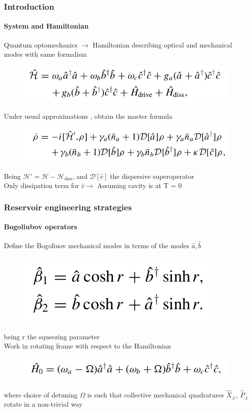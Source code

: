 \documentclass[aspectratio=43]{beamer}
\begin{document}
\begin{frame}
	
	\frametitle{Introduction}
	\framesubtitle{System and Hamiltonian}
	
	Quantum optomechanics $\longrightarrow$ Hamiltonian describing optical and mechanical modes with same formalism 
	\begin{figure}
		\includegraphics[width = 8 cm]{plots/hamiltonian_1.png}
	\end{figure}
	
	Under usual approximations {\color{blue}}, obtain the master formula 
	\begin{figure}
		\includegraphics[width = 8 cm]{plots/master_eq_1.png}
	\end{figure}

	Being $\mathcal{H}' = \mathcal{H} - \mathcal{H}_{\textrm{diss}}$, and $\mathcal{D}[\hat{c}]$ the dispersive superoperator\\
	Only dissipation term for $\hat{c} \longrightarrow$ {\color{blue}Assuming cavity is at T = 0}
	
\end{frame}

\begin{frame}
	
	\frametitle{Reservoir engineering strategies}
	\framesubtitle{Bogoliubov operators}
	
	Define the {\color{blue}Bogoliuov} mechanical modes in terms of the modes $\hat{a}, \hat{b}$
	\begin{figure}
		\includegraphics[width = 5 cm]{plots/bogoliubov_1.png}
	\end{figure}	

	being r the {\color{blue}squeezing parameter}\\
	Work in rotating frame with respect to the Hamiltonian
	\begin{figure}
		\includegraphics[width = 8 cm]{plots/hamiltonian_2.png}
	\end{figure}	

	where choice of detuning $\Omega$ is such that collective mechanical quadratures $\hat{X}_{\pm}$, $\hat{P}_{\pm}$ rotate in a non-trivial way

\end{frame}
\end{document}
